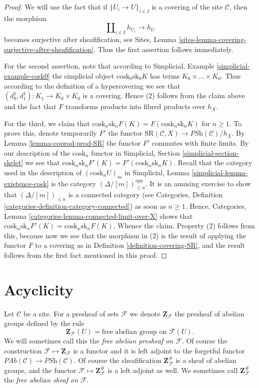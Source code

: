 \begin{proof}
We will use the fact that if
$\{U_i \to U\}_{i \in I}$ is a covering of the site
$\mathcal{C}$, then the morphism
$$
\amalg_{i \in I} h_{U_i} \to h_U
$$
becomes surjective after sheafification, see
Sites, Lemma \ref{sites-lemma-covering-surjective-after-sheafification}.
Thus the first assertion follows immediately.

\medskip\noindent
For the second assertion, note that according to
Simplicial, Example \ref{simplicial-example-cosk0}
the simplicial object $\text{cosk}_0 \text{sk}_0 K$
has terms $K_0 \times \ldots \times K_0$. Thus
according to the definition of a hypercovering we
see that $(d^1_0, d^1_1) : K_1 \to K_0 \times K_0$ is a
covering. Hence (2) follows from the claim above
and the fact that $F$ transforms products into fibred
products over $h_X$.

\medskip\noindent
For the third, we claim that
$\text{cosk}_n \text{sk}_n F(K) =
F(\text{cosk}_n \text{sk}_n K)$ for $n \geq 1$.
To prove this, denote temporarily $F'$ the functor
$\text{SR}(\mathcal{C}, X) \to \textit{PSh}(\mathcal{C})/h_X$.
By Lemma \ref{lemma-coprod-prod-SR} the functor
$F'$ commutes with finite limits.
By our description of the $\text{cosk}_n$ functor in
Simplicial, Section \ref{simplicial-section-skelet}
we see that $\text{cosk}_n \text{sk}_n F'(K) =
F'(\text{cosk}_n \text{sk}_n K)$.
Recall that the category used in the description of
$(\text{cosk}_n U)_m$ in
Simplicial, Lemma \ref{simplicial-lemma-existence-cosk}
is the category $(\Delta/[m])^{opp}_{\leq n}$. It is an
amusing exercise to show that $(\Delta/[m])_{\leq n}$ is
a connected category (see
Categories, Definition \ref{categories-definition-category-connected})
as soon as $n \geq 1$. Hence,
Categories, Lemma \ref{categories-lemma-connected-limit-over-X}
shows that $\text{cosk}_n \text{sk}_n F'(K) =
\text{cosk}_n \text{sk}_n F(K)$. Whence the claim.
Property (2) follows from this, because now we see that
the morphism in (2) is the result of applying the
functor $F$ to a covering as in Definition \ref{definition-covering-SR},
and the result follows from the first fact mentioned
in this proof.
\end{proof}



\section{Acyclicity}
\label{section-acyclicity}

\noindent
Let $\mathcal{C}$ be a site.
For a presheaf of sets $\mathcal{F}$ we denote $\mathbf{Z}_\mathcal{F}$
the presheaf of abelian groups defined by the rule
$$
\mathbf{Z}_\mathcal{F}(U) = \text{free abelian group on }\mathcal{F}(U).
$$
We will sometimes call this the {\it free abelian presheaf on $\mathcal{F}$}.
Of course the construction $\mathcal{F} \mapsto \mathbf{Z}_\mathcal{F}$
is a functor and it is left adjoint to the forgetful functor
$\textit{PAb}(\mathcal{C}) \to \textit{PSh}(\mathcal{C})$.
Of course the sheafification $\mathbf{Z}_\mathcal{F}^\#$ is
a sheaf of abelian groups, and the functor
$\mathcal{F} \mapsto \mathbf{Z}_\mathcal{F}^\#$ is a
left adjoint as well. We sometimes call $\mathbf{Z}_\mathcal{F}^\#$
the {\it free abelian sheaf on $\mathcal{F}$}.

